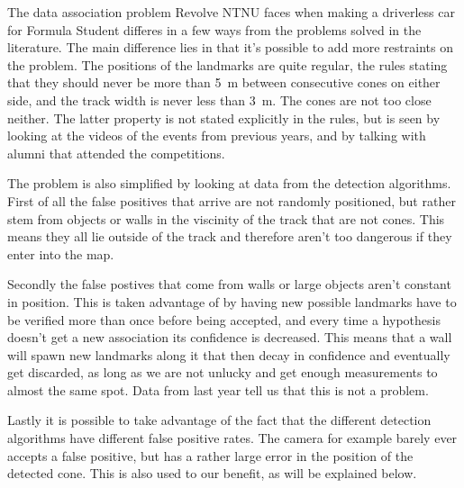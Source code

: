 The data association problem Revolve NTNU faces when making a driverless car for Formula Student differes in a few ways from the problems solved in the literature. The main difference lies in that it's possible to add more restraints on the problem. The positions of the landmarks are quite regular, the rules stating that they should never be more than \SI{5}{\meter} between consecutive cones on either side, and the track width is never less than \SI{3}{\meter}. The cones are not too close neither. The latter property is not stated explicitly in the rules, but is seen by looking at the videos of the events from previous years, and by talking with alumni that attended the competitions. 

The problem is also simplified by looking at data from the detection algorithms. First of all the false positives that arrive are not randomly positioned, but rather stem from objects or walls in the viscinity of the track that are not cones. This means they all lie outside of the track and therefore aren't too dangerous if they enter into the map. 

Secondly the false postives that come from walls or large objects aren't constant in position. This is taken advantage of by having new possible landmarks have to be verified more than once before being accepted, and every time a hypothesis doesn't get a new association its confidence is decreased. This means that a wall will spawn new landmarks along it that then decay in confidence and eventually get discarded, as long as we are not unlucky and get enough measurements to almost the same spot. Data from last year tell us that this is not a problem. 

Lastly it is possible to take advantage of the fact that the different detection algorithms have different false positive rates. The camera for example barely ever accepts a false positive, but has a rather large error in the position of the detected cone. This is also used to our benefit, as will be explained below. 

